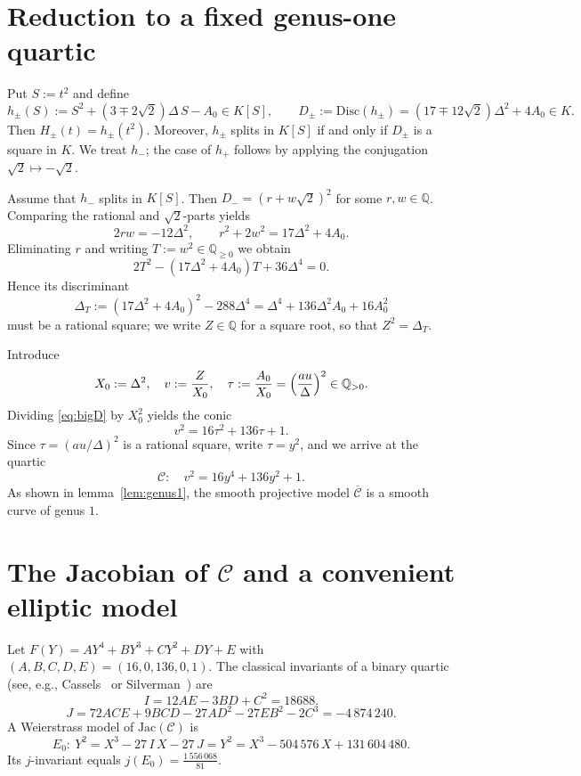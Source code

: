 \documentclass[12pt]{article}
\theoremstyle{remark}
\theoremstyle{definition}
\begin{document}

\section{Reduction to a fixed genus-one quartic}\label{sec:reduction}
Put $S:=t^2$ and define
\begin{equation}\label{eq:DeltaS}
h_\pm(S):=S^2+(3\mp2\sqrt2)\Delta\,S-A_0\in K[S],\qquad
D_\pm:=\mathrm{Disc}(h_\pm)=(17\mp12\sqrt2)\Delta^2+4A_0\in K.
\end{equation}
Then $H_\pm(t)=h_\pm(t^2)$. Moreover, $h_\pm$ splits in $K[S]$ if and only if $D_\pm$ is a square in $K$.
We treat $h_-$; the case of $h_+$ follows by applying the conjugation $\sqrt2\mapsto-\sqrt2$.

Assume that $h_-$ splits in $K[S]$. Then $D_-=(r+w\sqrt2)^2$ for some $r,w\in\mathbb{Q}$.
Comparing the rational and $\sqrt2$-parts yields
\begin{equation}\label{eq:rs}
2rw=-12\Delta^2,\qquad r^2+2w^2=17\Delta^2+4A_0.
\end{equation}
Eliminating $r$ and writing $T:=w^2\in\mathbb{Q}_{\ge0}$ we obtain
\begin{equation}\label{eq:Tquad}
2T^2-(17\Delta^2+4A_0)T+36\Delta^4=0.
\end{equation}
Hence its discriminant
\begin{equation}\label{eq:bigD}
\Delta_T:=(17\Delta^2+4A_0)^2-288\Delta^4
=\Delta^4+136\Delta^2A_0+16A_0^2
\end{equation}
must be a rational square; we write $Z\in\mathbb{Q}$ for a square root, so that $Z^2=\Delta_T$.

Introduce
\[
X_0:=\Delta^2,\quad v:=\frac{Z}{X_0},\quad
\tau:=\frac{A_0}{X_0}=\Bigl(\frac{au}{\Delta}\Bigr)^2\in\mathbb{Q}_{>0}.
\]
Dividing \eqref{eq:bigD} by $X_0^2$ yields the conic
\begin{equation}\label{eq:conic}
v^2=16\tau^2+136\tau+1.
\end{equation}
Since $\tau=(au/\Delta)^2$ is a rational square, write $\tau=y^2$, and we arrive at the quartic
\begin{equation}\label{eq:quartic}
\mathcal{C}:\quad v^2=16y^4+136y^2+1.
\end{equation}
As shown in lemma~\ref{lem:genus1}, the smooth projective model $\overline{\mathcal{C}}$ is a smooth curve of genus $1$.

\section{The Jacobian of \texorpdfstring{$\mathcal{C}$}{C} and a convenient elliptic model}\label{sec:jac}
Let $F(Y)=AY^4+BY^3+CY^2+DY+E$ with $(A,B,C,D,E)=(16,0,136,0,1)$.
The classical invariants of a binary quartic (see, e.g., Cassels~\cite{Cassels} or Silverman~\cite{SilvermanAEC}) are
\[
I=12AE-3BD+C^2=18688.
\]
\[
J=72ACE+9BCD-27AD^2-27EB^2-2C^3=-4\,874\,240.
\]
A Weierstrass model of $\mathrm{Jac}(\mathcal{C})$ is
\begin{equation}\label{eq:E0}
E_0:\ Y^2=X^3-27\,I\,X-27\,J
=Y^2=X^3-504\,576\,X+131\,604\,480.
\end{equation}
Its $j$-invariant equals $j(E_0)=\frac{1\,556\,068}{81}$.
\end{document}
